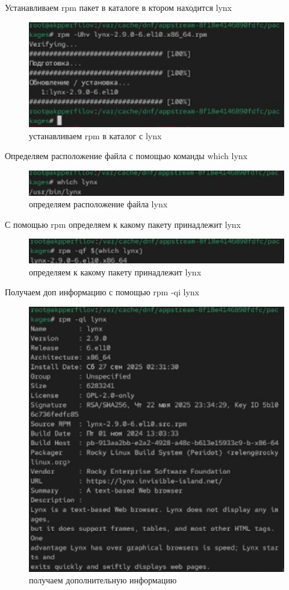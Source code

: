 \documentclass[
  english,
  russian,
  12pt,
  a4paper,
  DIV=11,
  numbers=noendperiod]{scrreprt}
\begin{document}
Устанавливаем rpm пакет в каталоге в ктором находится lynx

\begin{figure}

{\centering \includegraphics[width=0.71\linewidth,height=\textheight,keepaspectratio]{image/21.jpg}

}

\caption{устанавливаем rpm в каталог с lynx}

\end{figure}%

Определяем расположение файла с помощью команды which lynx

\begin{figure}

{\centering \includegraphics[width=0.71\linewidth,height=\textheight,keepaspectratio]{image/22.jpg}

}

\caption{определяем расположение файла lynx}

\end{figure}%

С помощью rpm определяем к какому пакету принадлежит lynx

\begin{figure}

{\centering \includegraphics[width=0.3\linewidth,height=\textheight,keepaspectratio]{image/23.jpg}

}

\caption{определяем к какому пакету принадлежит lynx}

\end{figure}%

Получаем доп информацию с помощью rpm -qi lynx

\begin{figure}

{\centering \includegraphics[width=0.3\linewidth,height=\textheight,keepaspectratio]{image/24.jpg}

}

\caption{получаем дополнительную информацию}

\end{figure}%
\end{document}
